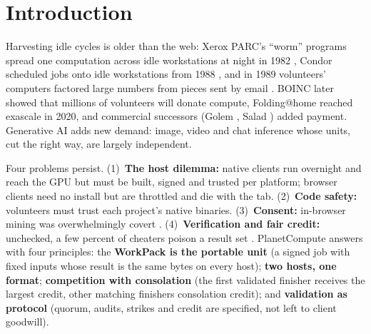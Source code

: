 \documentclass[11pt,a4paper]{article}
\theoremstyle{definition}
\theoremstyle{plain}
\begin{document}
\section{Introduction}

Harvesting idle cycles is older than the web: Xerox PARC's ``worm'' programs spread one computation across idle
workstations at night in 1982 \citep{shoch1982worm}, Condor scheduled jobs onto idle workstations from 1988
\citep{litzkow1988condor}, and in 1989 volunteers' computers factored large numbers from pieces sent by email
\citep{lenstra1990factoring}. BOINC \citep{anderson2004boinc,anderson2020boinc} later showed that
millions of volunteers will donate compute, Folding@home \citep{beberg2009folding,zimmerman2021folding} reached exascale in 2020, and
commercial successors (Golem \citep{golem2016}, Salad \citep{salad}) added payment. Generative AI adds new demand: image, video
and chat inference whose units, cut the right way, are largely independent.

Four problems persist. (1)~\textbf{The host dilemma:} native clients run overnight and reach the GPU but
must be built, signed and trusted per platform; browser clients need no install but are throttled and die
with the tab. (2)~\textbf{Code safety:} volunteers must trust each project's native binaries.
(3)~\textbf{Consent:} in-browser mining was overwhelmingly covert
\citep{eskandari2018cryptojacking,konoth2018minesweeper}. (4)~\textbf{Verification and fair credit:} unchecked,
a few percent of cheaters poison a result set \citep{sarmenta2002sabotage}.
PlanetCompute answers with four principles: the \textbf{WorkPack is the portable unit} (a signed job with fixed inputs whose result
is the same bytes on every host); \textbf{two hosts, one format}; \textbf{competition
with consolation} (the first validated finisher receives the largest credit, other matching finishers
consolation credit); and \textbf{validation as protocol} (quorum, audits, strikes and credit are specified,
not left to client goodwill).
\end{document}
